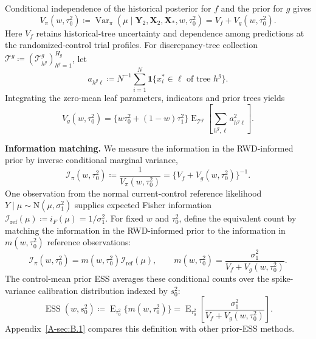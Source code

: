 \documentclass[11pt]{article}
\newcommand{\E}{\operatorname{E}}
\newcommand{\Var}{\operatorname{Var}}
\newcommand{\ESS}{\operatorname{ESS}}
\newcommand{\N}{\mathrm{N}}
\newcommand{\ind}{\mathbf{1}}
\theoremstyle{remark}\newtheorem{remark}{Remark}[section]
\providecommand{\DIFaddtex}[1]{{\protect\color{blue} \sf #1}} %
\providecommand{\DIFdeltex}[1]{{\protect\color{red} \scriptsize #1}} %
\providecommand{\DIFaddbegin}{} %
\providecommand{\DIFaddend}{} %
\providecommand{\DIFdelbegin}{} %
\providecommand{\DIFdelend}{} %
\providecommand{\DIFadd}[1]{\texorpdfstring{\DIFaddtex{#1}}{#1}} %
\providecommand{\DIFdel}[1]{\texorpdfstring{\DIFdeltex{#1}}{}} %
\begin{document}
Conditional independence of the historical posterior for $f$ and the prior for $g$ gives
\DIFdelbegin %
\DIFdelend \DIFaddbegin \begin{equation}\label{eq:targetvariance}
V_{\pi}(w,\tau_0^2)
\coloneqq\Var_{\pi}(\mu\mid\mathbf Y_{2},\mathbf X_{2},\mathbf X_*,w,\tau_0^2)
=V_f+V_g(w,\tau_0^2).
\end{equation}\DIFaddend 
Here $V_f$ retains historical-tree uncertainty and dependence among predictions at the \DIFdelbegin \DIFdel{randomized-control }\DIFdelend \DIFaddbegin \DIFadd{trial }\DIFaddend profiles. For discrepancy-tree collection
$\mathcal T^g\coloneqq(\mathcal T_{h^g}^g)_{h^g=1}^{H_g}$, let
\DIFdelbegin %
\DIFdelend \DIFaddbegin \[
a_{h^g\ell}\coloneqq N^{-1}\sum_{i=1}^{N}
\ind\{x_i^*\in\ell\text{ of tree }h^g\}.
\]\DIFaddend 
Integrating the zero-mean leaf parameters, indicators and prior trees yields
\begin{equation}\label{eq:Vgmain}
V_g(w,\tau_0^2)
=\{w\tau_0^2+(1-w)\tau_1^2\}
\E_{\mathcal T^g}\!\left[\sum_{h^g,\ell}a_{h^g\ell}^2\right].
\end{equation}

\DIFdelbegin %
\DIFdel{\textbf{Information matching.}
}\DIFdelend We measure the information in the RWD-informed prior by inverse conditional marginal variance,
\[
\mathcal I_{\pi}(w,\tau_0^2)
\coloneqq\frac{1}{V_{\pi}(w,\tau_0^2)}
=\{V_f+V_g(w,\tau_0^2)\}^{-1}.
\]
One observation from the normal current-control reference likelihood
$Y\mid\mu\sim\N(\mu,\sigma_{1}^2)$ supplies expected Fisher information
$\mathcal I_{\mathrm{ref}}(\mu)\coloneqq i_F(\mu)=1/\sigma_{1}^2$. For fixed $w$ and $\tau_0^2$, define the equivalent count by matching the information in the RWD-informed prior to the information in $m(w,\tau_0^2)$ reference observations:
\begin{equation}\label{eq:matchedcount}
\mathcal I_{\pi}(w,\tau_0^2)
=m(w,\tau_0^2)\mathcal I_{\mathrm{ref}}(\mu),
\qquad
m(w,\tau_0^2)=\frac{\sigma_{1}^2}{V_f+V_g(w,\tau_0^2)}.
\end{equation}
The \DIFaddbegin \DIFadd{control-mean }\DIFaddend prior ESS averages these conditional counts over the spike-variance calibration distribution indexed by $s_0^2$:
\begin{equation}\label{eq:essgeneral}
\ESS(w,s_0^2)
\coloneqq\E_{\tau_0^2}\{m(w,\tau_0^2)\}
=\E_{\tau_0^2}\!\left[
\frac{\sigma_{1}^2}{V_f+V_g(w,\tau_0^2)}
\right].
\end{equation}
Appendix~\ref{A-sec:B.1} compares this definition with other prior-ESS methods.
\end{document}
